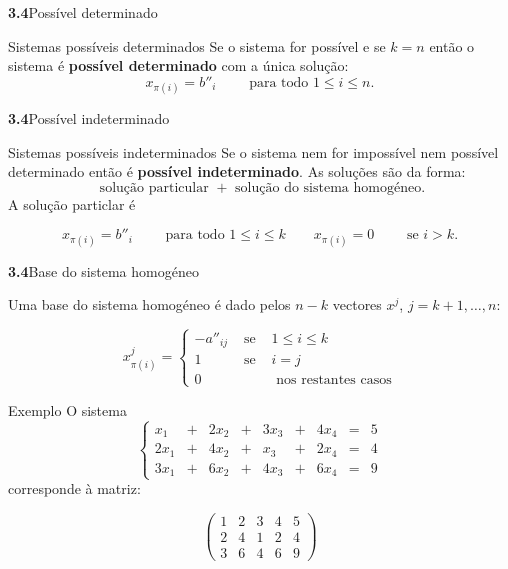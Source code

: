\documentclass{beamer}
\begin{document}
\begin{frame}{\bf 3.4}{Possível determinado}

\begin{block}{Sistemas possíveis determinados}
Se o sistema for possível e se $k=n$ então o sistema é {\bf possível determinado} com a única solução:
$$x_{\pi(i)} = b''_i \qquad \mbox{ para todo } 1\leq i \leq n.$$ 
\end{block}


\end{frame}

\begin{frame}{\bf 3.4}{Possível indeterminado}

\begin{block}{Sistemas possíveis indeterminados}
Se o sistema nem for impossível nem possível determinado então é {\bf possível indeterminado}. As soluções são da forma: 
$$ \mbox{ solução particular } + \mbox{ solução do sistema homogéneo}.$$
\pause A solução particlar é 

$$x_{\pi(i)} = b''_i \qquad \mbox{ para todo } 1\leq i \leq k \qquad x_{\pi(i)}=0 \qquad \mbox{ se } i>k.$$ 
\end{block}
\end{frame}

\begin{frame}{\bf 3.4}{Base do sistema homogéneo}
\begin{block}{}
Uma base do sistema homogéneo é dado pelos $n-k$ vectores $x^j$, $j=k+1, \ldots, n$:

$$x^j_{\pi(i)}=\left\{\begin{array}{cll} 
-a''_{ij} &\mbox{ se }& 1\leq i \leq k \\
1 & \mbox{ se } & i=j \\ 
0 & &\mbox{ nos restantes casos}\end{array}\right.$$
\end{block}
\end{frame}

\begin{frame}{Exemplo}
O sistema 
$$\left\{ \begin{array}{rcrcrcrcr}
x_1 & + & 2x_2  &+& 3x_3 &+& 4x_4 &=& 5 \\
2x_1 & + & 4x_2  &+& x_3 &+& 2x_4 &=& 4 \\
3x_1 & + & 6x_2  &+& 4x_3 &+& 6x_4 &=& 9 
\end{array}\right.$$
corresponde à matriz:

$$\left( \begin{array}{rrrr|r}
1 & 2& 3& 4& 5 \\
2&  4& 1& 2& 4 \\
3& 6& 4& 6& 9 
\end{array}\right)$$

\end{frame}
\end{document}
